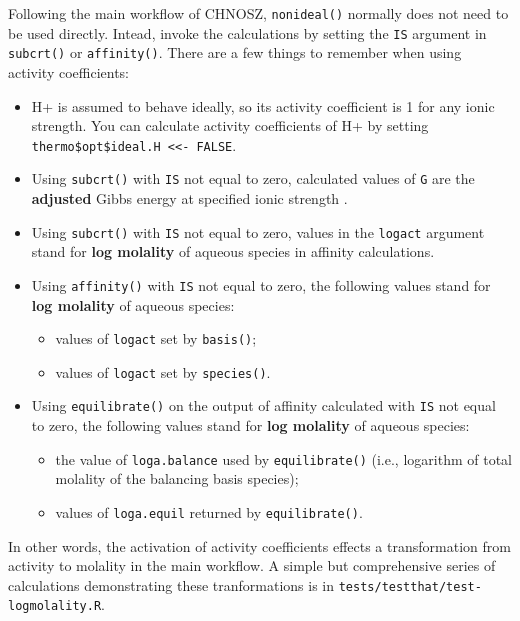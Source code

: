 \documentclass[]{tufte-book}
\providecommand{\tightlist}{%
  \setlength{\itemsep}{0pt}\setlength{\parskip}{0pt}}
\begin{document}
Following the main workflow of CHNOSZ, {\texttt{nonideal()}} normally
does not need to be used directly. Intead, invoke the calculations by
setting the \texttt{IS} argument in {\texttt{subcrt()}} or
{\texttt{affinity()}}. There are a few things to remember when using
activity coefficients:

\begin{itemize}
\item
  H+ is assumed to behave ideally, so its activity coefficient is 1 for
  any ionic strength. You can calculate activity coefficients of H+ by
  setting \texttt{thermo\$opt\$ideal.H\ \textless{}\textless{}-\ FALSE}.
\item
  Using {\texttt{subcrt()}} with \texttt{IS} not equal to zero,
  calculated values of \texttt{G} are the \textbf{adjusted} Gibbs energy
  at specified ionic strength \citep[denoted by
  Δ\emph{G}°(\emph{I});][]{Alb96}.
\item
  Using {\texttt{subcrt()}} with \texttt{IS} not equal to zero, values
  in the \texttt{logact} argument stand for \textbf{log molality} of
  aqueous species in affinity calculations.
\item
  Using {\texttt{affinity()}} with \texttt{IS} not equal to zero, the
  following values stand for \textbf{log molality} of aqueous species:

  \begin{itemize}
  \tightlist
  \item
    values of \texttt{logact} set by {\texttt{basis()}};
  \item
    values of \texttt{logact} set by {\texttt{species()}}.
  \end{itemize}
\item
  Using {\texttt{equilibrate()}} on the output of affinity calculated
  with \texttt{IS} not equal to zero, the following values stand for
  \textbf{log molality} of aqueous species:

  \begin{itemize}
  \tightlist
  \item
    the value of \texttt{loga.balance} used by {\texttt{equilibrate()}}
    (i.e., logarithm of total molality of the balancing basis species);
  \item
    values of \texttt{loga.equil} returned by {\texttt{equilibrate()}}.
  \end{itemize}
\end{itemize}

In other words, the activation of activity coefficients effects a
transformation from activity to molality in the main workflow. A simple
but comprehensive series of calculations demonstrating these
tranformations is in \texttt{tests/testthat/test-logmolality.R}.
\end{document}
